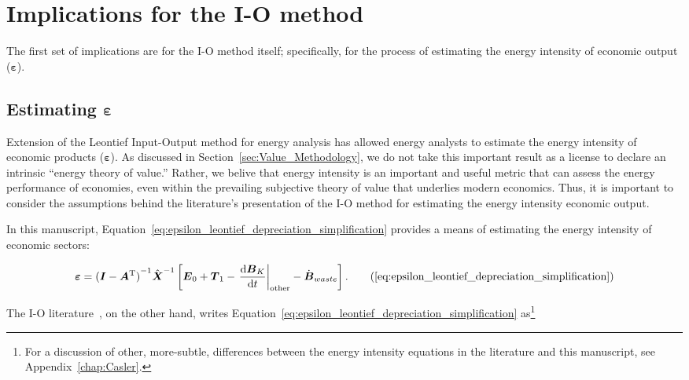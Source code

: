 \section{Implications for the I-O method}
\label{sec:Implications_for_IO}

The first set of implications are for the I-O method itself;
specifically, for the process of estimating
the energy intensity of economic output ($\bm{\varepsilon}$).


\subsection{Estimating $\bm{\varepsilon}$}
\label{sec:estimating_epsilon-implications_chapter}

Extension of the Leontief 
Input-Output method
for energy analysis has allowed energy analysts to estimate 
the energy intensity
of economic products ($\bm{\varepsilon}$). 
As discussed in Section~\ref{sec:Value_Methodology},
we do not take this important result as a license
to declare an intrinsic ``energy theory of value.''
Rather, we belive that energy intensity is an 
important and useful metric that can assess 
the energy performance of economies,
even within the prevailing subjective theory of value
that underlies modern economics. 
Thus, it is important to consider the assumptions behind
the literature's presentation of the I-O method 
for estimating the energy intensity economic output.

In this manuscript, Equation~\ref{eq:epsilon_leontief_depreciation_simplification} 
provides a means of estimating the energy intensity of economic sectors:

\begin{equation}
	\bm{\varepsilon} 
	= {(\vec{I} - \vec{A}^{\mathrm{T}})}^{-1}\hat{\vec{X}}^{-1}
		\left[\vec{E}_{0} 
				+ \vec{T}_{1} 
				- \left. \frac{\mathrm{d}\vec{B}_{K}}{\mathrm{d}t} \right|_{\mathrm{other}}
				- \dot{\vec{B}}_{waste}
		\right]. \tag{\ref{eq:epsilon_leontief_depreciation_simplification}}
\end{equation}

\noindent{}The I-O literature~\cite{Bullard1975,Casler1984}, 
on the other hand, 
writes Equation~\ref{eq:epsilon_leontief_depreciation_simplification} 
as\footnote{For a discussion of other, more-subtle, differences
between the energy intensity equations in the literature
and this manuscript, see Appendix~\ref{chap:Casler}.}

